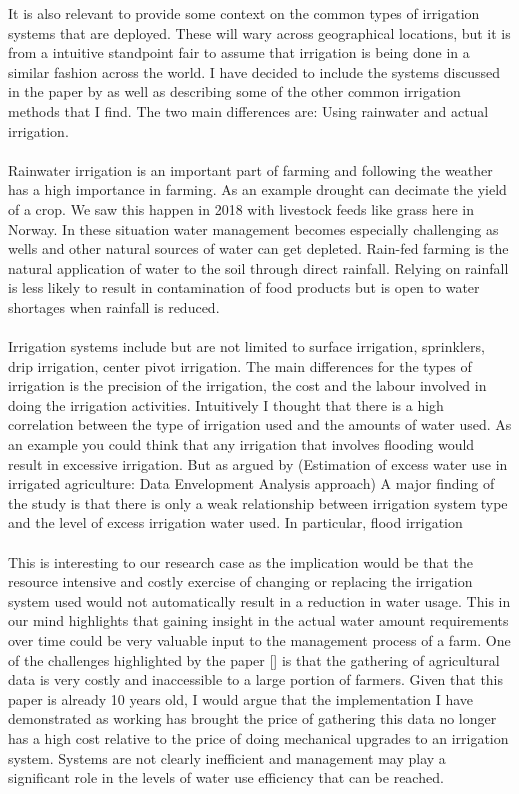 \documentclass[]{uiophd}
\begin{document}
It is also relevant to provide some context on the common types of irrigation systems that are deployed. These will wary across geographical locations, but it is from a intuitive standpoint fair to assume that irrigation is being done in a similar fashion across the world. I have decided to include the systems discussed in the paper by \parencite{LILIENFELD200773} as well as describing some of the  other common irrigation methods that I find. The two main differences are: Using rainwater and actual irrigation. 
\\\\
Rainwater irrigation is an important part of farming and following the weather has a high importance in farming. As an example drought can decimate the yield of a crop. We saw this happen in 2018 with livestock feeds like grass here in Norway. In these situation water management becomes especially challenging as wells and other natural sources of water can get depleted. Rain-fed farming is the natural application of water to the soil through direct rainfall. Relying on rainfall is less likely to result in contamination of food products but is open to water shortages when rainfall is reduced. \parencite{cdc}
\\\\
Irrigation systems include but are not limited to surface irrigation, sprinklers, drip irrigation, center pivot irrigation. The main differences for the types of irrigation is the precision of the irrigation, the cost and the labour involved in doing the irrigation activities. Intuitively I thought that there is a high correlation between the type of irrigation used and the amounts of water used. As an example you could think that any irrigation that involves flooding would result in excessive irrigation. But as argued by (Estimation of excess water use in irrigated agriculture: Data Envelopment Analysis approach) A major finding of the study is that there is only a weak relationship between irrigation system type and the level of excess irrigation water used. In particular, flood irrigation \parencite{LILIENFELD200773}
\\\\
This is interesting to our research case as the implication would be that the resource intensive and costly exercise of changing or replacing the irrigation system used would not automatically result in a reduction in water usage. This in our mind highlights that gaining insight in the actual water amount requirements over time could be very valuable input to the management process of a farm. One of  the challenges highlighted by the paper [] is that the gathering of agricultural data is very costly and inaccessible to a large portion of farmers. Given that this paper is already 10 years old, I would argue that the implementation I have demonstrated as working has brought the price of gathering this data no longer has a high cost relative to the price of doing mechanical upgrades to an irrigation system. Systems are not clearly inefficient and management may play a significant role in the levels of water use efficiency that can be reached. \parencite{LILIENFELD200773}
\end{document}
